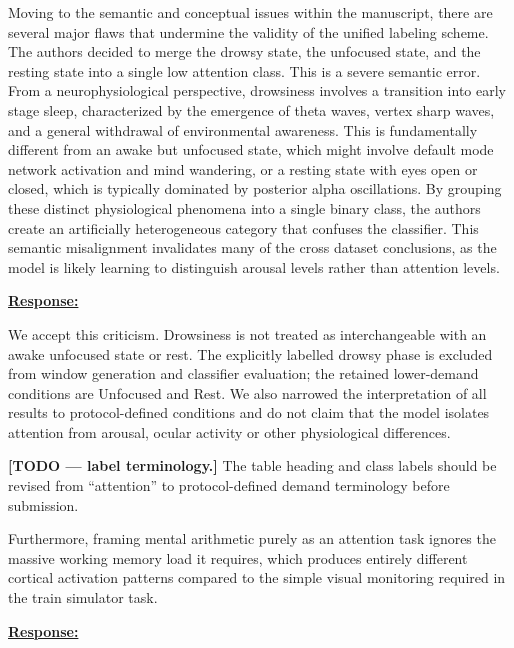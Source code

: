 \documentclass{article}
\begin{document}
\begin{cmt}{}{}

Moving to the semantic and conceptual issues within the manuscript, there are
several major flaws that undermine the validity of the unified labeling scheme.
The authors decided to merge the drowsy state, the unfocused state, and the
resting state into a single low attention class. This is a severe semantic
error. From a neurophysiological perspective, drowsiness involves a transition
into early stage sleep, characterized by the emergence of theta waves, vertex
sharp waves, and a general withdrawal of environmental awareness. This is
fundamentally different from an awake but unfocused state, which might involve
default mode network activation and mind wandering, or a resting state with eyes
open or closed, which is typically dominated by posterior alpha oscillations. By
grouping these distinct physiological phenomena into a single binary class, the
authors create an artificially heterogeneous category that confuses the
classifier. This semantic misalignment invalidates many of the cross dataset
conclusions, as the model is likely learning to distinguish arousal levels
rather than attention levels.

\end{cmt}
\vspace{0.1cm}
\noindent
\underline{\textbf{Response:}}
\vspace{0.2cm}

We accept this criticism. Drowsiness is not treated as interchangeable with an
awake unfocused state or rest. The explicitly labelled drowsy phase is excluded
from window generation and classifier evaluation; the retained lower-demand
conditions are Unfocused and Rest. We also narrowed the interpretation of all
results to protocol-defined conditions and do not claim that the model isolates
attention from arousal, ocular activity or other physiological differences.

\textbf{[TODO --- label terminology.]}
The table heading and class labels should be revised from ``attention'' to
protocol-defined demand terminology before submission.

\vspace{0.3cm}


\begin{cmt}{}{}

Furthermore, framing mental arithmetic purely as an attention task ignores the
massive working memory load it requires, which produces entirely different
cortical activation patterns compared to the simple visual monitoring required
in the train simulator task.

\end{cmt}
\vspace{0.1cm}
\noindent
\underline{\textbf{Response:}}
\vspace{0.2cm}
\end{document}
